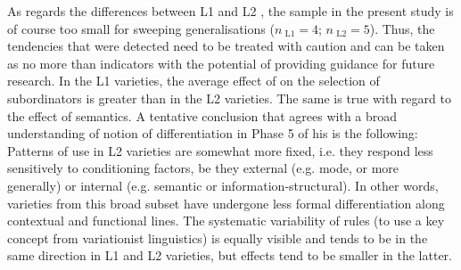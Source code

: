 As regards the differences between L1 and L2 , the sample in the present study is of course too small for sweeping generalisations ($n_{\text{~L1}} = 4$; $n_{\text{~L2}} = 5$). Thus, the tendencies that were detected need to be treated with caution and can be taken as no more than indicators with the potential of providing guidance for future research. In the L1 varieties, the average effect of  on the selection of subordinators is greater than in the L2 varieties. The same is true with regard to the effect of semantics. A tentative conclusion that agrees with a broad understanding of  notion of differentiation in Phase 5 of his  is the following: Patterns of use in L2 varieties are somewhat more fixed, i.e. they respond less sensitively to conditioning factors, be they external (e.g. mode, or  more generally) or internal (e.g. semantic or information-structural). In other words, varieties from this broad subset have undergone less formal differentiation along contextual and functional lines. The systematic variability of rules (to use a key concept from variationist linguistics) is equally visible and tends to be in the same direction in L1 and L2 varieties, but effects tend to be smaller in the latter.

